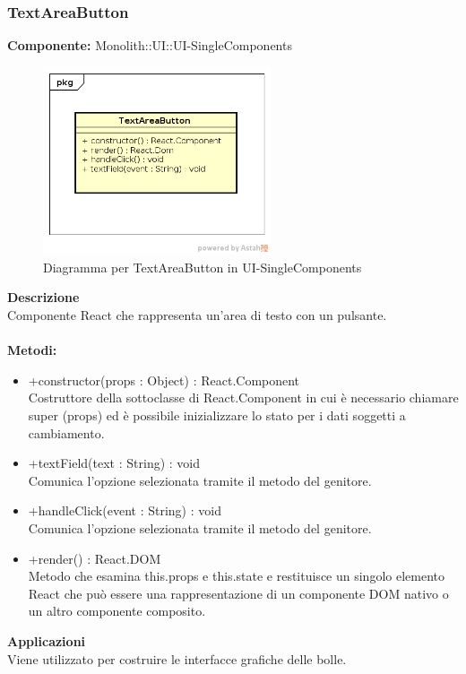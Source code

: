 \subsubsection{TextAreaButton}
\textbf{Componente:}  Monolith::UI::UI-SingleComponents\\
   \FloatBarrier
   \begin{figure}[ht]
   \centering
   \includegraphics[width=0.6\textwidth]{img/single-TextAreaButton}
   \caption{{Diagramma per TextAreaButton in UI-SingleComponents}}
\end{figure}
\FloatBarrier
\textbf{Descrizione}\\
Componente React che rappresenta un'area di testo con un pulsante. \\\\
\textbf{Metodi:} \begin{itemize}\item +constructor(props : Object) : React.Component \\Costruttore della sottoclasse di React.Component in cui è necessario chiamare super (props) ed è possibile inizializzare lo stato per i dati soggetti a cambiamento.\item +textField(text : String) : void \\Comunica l’opzione selezionata tramite il metodo del genitore.\item +handleClick(event : String) : void  \\Comunica l’opzione selezionata tramite il metodo del genitore. \item +render() : React.DOM \\Metodo che esamina this.props e this.state e restituisce un singolo elemento React che può essere una rappresentazione di un componente DOM nativo o un altro componente composito.\end{itemize} 


\textbf{Applicazioni}\\
Viene utilizzato per costruire le interfacce grafiche delle bolle. 


